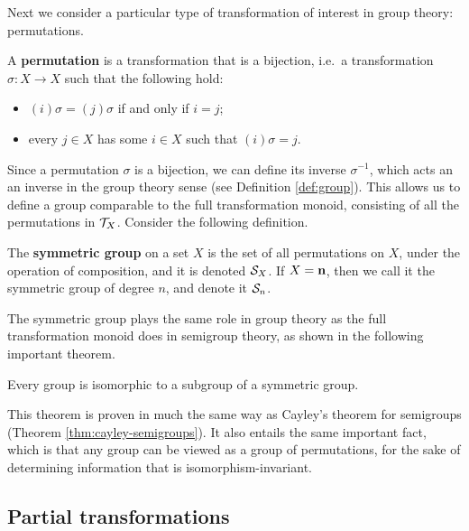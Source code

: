 Next we consider a particular type of transformation of interest in group
theory: permutations.

\begin{definition}
  \label{def:permutation}
  A \textbf{permutation} is a transformation that is a bijection, i.e.~a
  transformation $\sigma: X \to X$ such that the following hold:
  \begin{itemize}
  \item $(i)\sigma=(j)\sigma$ if and only if $i=j$;
  \item every $j \in X$ has some $i \in X$ such that $(i)\sigma = j$.
  \end{itemize}
\end{definition}

Since a permutation $\sigma$ is a bijection, we can define its inverse
$\sigma^{-1}$, which acts an an inverse in the group theory sense (see
Definition \ref{def:group}).  This allows us to define a group comparable to the
full transformation monoid, consisting of all the permutations in $\mathcal{T}_X$.
Consider the following definition.

\begin{definition}
  \label{def:sn}
  The \textbf{symmetric group} on a set $X$ is the set of all permutations on
  $X$, under the operation of composition, and it is denoted $\mathcal{S}_X$.  If
  $X = \mathbf{n}$, then we call it the symmetric group of degree $n$, and denote it
  $\mathcal{S}_n$.
\end{definition}

The symmetric group plays the same role in group theory as the full
transformation monoid does in semigroup theory, as shown in the following
important theorem.

\begin{theorem}
  \label{thm:cayley-groups}
  Every group is isomorphic to a subgroup of a symmetric group.
\end{theorem}

This theorem is proven in much the same way as Cayley's theorem for semigroups
(Theorem \ref{thm:cayley-semigroups}).  It also entails the same important fact,
which is that any group can be viewed as a group of permutations, for the sake
of determining information that is isomorphism-invariant.

\subsection{Partial transformations}
\label{sec:partial-transformations}

